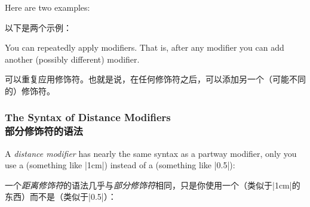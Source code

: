 Here are two examples:

以下是两个示例：
%
\begin{codeexample}[preamble={\usetikzlibrary{calc}}]
\end{codeexample}

\begin{codeexample}[preamble={\usetikzlibrary{calc}}]
\end{codeexample}

You can repeatedly apply modifiers. That is, after any modifier you can add
another (possibly different) modifier.

可以重复应用修饰符。也就是说，在任何修饰符之后，可以添加另一个（可能不同的）修饰符。
%
\begin{codeexample}[preamble={\usetikzlibrary{calc}}]
\end{codeexample}


\subsubsection{The Syntax of Distance Modifiers\\部分修饰符的语法}

A \emph{distance modifier} has nearly the same syntax as a partway modifier,
only you use a  (something like |1cm|) instead of a
 (something like |0.5|):

一个\emph{距离修饰符}的语法几乎与\emph{部分修饰符}相同，只是你使用一个（类似于|1cm|的东西）而不是（类似于|0.5|）：


